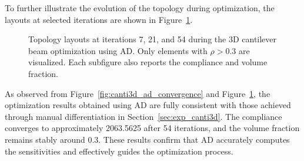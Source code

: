 \documentclass[mathpazo]{cicp}
\begin{document}
To further illustrate the evolution of the topology during optimization, the layouts at selected iterations are shown in Figure~\ref{fig:canti3d_ad_topos}.
\vspace{-2ex} %
\begin{figure}[htp]
	\centering
	\caption{Topology layouts at iterations 7, 21, and 54 during the 3D cantilever beam optimization using AD. Only elements with $\rho>0.3$ are visualized. Each subfigure also reports the compliance and volume fraction.}
	\label{fig:canti3d_ad_topos}
\end{figure}
\vspace{-2ex} %

As observed from Figure~\ref{fig:canti3d_ad_convergence} and Figure~\ref{fig:canti3d_ad_topos}, the optimization results obtained using AD are fully consistent with those achieved through manual differentiation in Section~\ref{sec:exp_canti3d}. The compliance converges to approximately 2063.5625 after 54 iterations, and the volume fraction remains stably around 0.3. These results confirm that AD accurately computes the sensitivities and effectively guides the optimization process.
\end{document}
